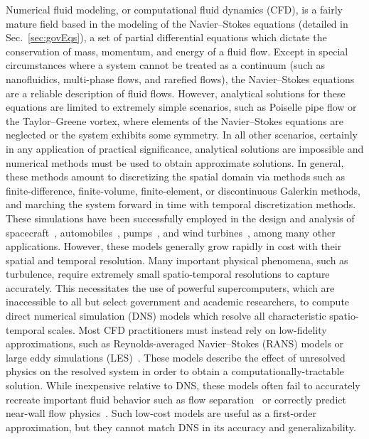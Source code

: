 Numerical fluid modeling, or computational fluid dynamics (CFD), is a fairly mature field based in the modeling of the Navier--Stokes equations (detailed in Sec.~\ref{sec:govEqs}), a set of partial differential equations which dictate the conservation of mass, momentum, and energy of a fluid flow. Except in special circumstances where a system cannot be treated as a continuum (such as nanofluidics,  multi-phase flows, and rarefied flows), the Navier--Stokes equations are a reliable description of fluid flows. However, analytical solutions for these equations are limited to extremely simple scenarios, such as Poiselle pipe flow or the Taylor--Greene vortex, where elements of the Navier--Stokes equations are neglected or the system exhibits some symmetry. In all other scenarios, certainly in any application of practical significance, analytical solutions are impossible and numerical methods must be used to obtain approximate solutions. In general, these methods amount to discretizing the spatial domain via methods such as finite-difference, finite-volume, finite-element, or discontinuous Galerkin methods, and marching the system forward in time with temporal discretization methods. These simulations have been successfully employed in the design and analysis of spacecraft~\cite{Murman2005}, automobiles~\cite{Kobayashi1992}, pumps~\cite{Shah2013}, and wind turbines~\cite{Sumner2010}, among many other applications. However, these models generally grow rapidly in cost with their spatial and temporal resolution. Many important physical phenomena, such as turbulence, require extremely small spatio-temporal resolutions to capture accurately. This necessitates the use of powerful supercomputers, which are inaccessible to all but select government and academic researchers, to compute direct numerical simulation (DNS) models which resolve all characteristic spatio-temporal scales. Most CFD practitioners must instead rely on low-fidelity approximations, such as Reynolds-averaged Navier--Stokes (RANS) models or large eddy simulations (LES)~\cite{Alfonsi2009,Mason1994}. These models describe the effect of unresolved physics on the resolved system in order to obtain a computationally-tractable solution. While inexpensive relative to DNS, these models often fail to accurately recreate important fluid behavior such as flow separation~\cite{Catalano2003} or correctly predict near-wall flow physics~\cite{Nicoud2011}. Such low-cost models are useful as a first-order approximation, but they cannot match DNS in its accuracy and generalizability.

